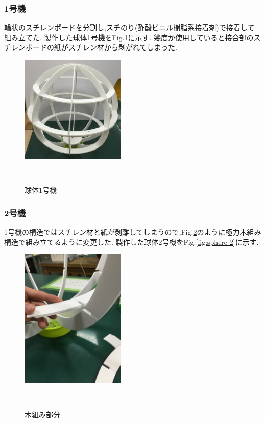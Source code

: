\documentclass[a4paper]{jarticle}
\begin{document}
\subsubsection{1号機}
輪状のスチレンボードを分割し,スチのり(酢酸ビニル樹脂系接着剤)で接着して組み立てた.
製作した球体1号機をFig.\ref{fig:sphere-1}に示す.
幾度か使用していると接合部のスチレンボードの紙がスチレン材から剥がれてしまった.

\begin{figure}[htbp]
 \begin{center}
  \includegraphics[width=50mm]{image/sphere-1.JPG}
 　\caption{球体1号機}
 　\label{fig:sphere-1}
 \end{center}
\end{figure}

\subsubsection{2号機}
1号機の構造ではスチレン材と紙が剥離してしまうので,Fig.\ref{fig:kigumi}のように極力木組み構造で組み立てるように変更した.
製作した球体2号機をFig.\ref{fig:sphere-2}に示す.

\begin{figure}[htbp]
 \begin{center}
  \includegraphics[width=50mm]{image/kigumi.JPG}
 　\caption{木組み部分}
 　\label{fig:kigumi}
 \end{center}
\end{figure}
\end{document}
